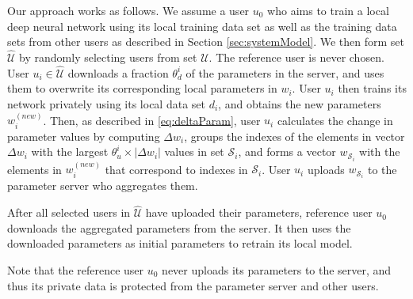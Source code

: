 \documentclass[conference]{IEEEtran}
\begin{document}
Our approach works as follows. 
We assume a user $u_0$ who aims to train a local deep neural network using its local training data set as well as the training
data sets from other users as described in Section \ref{sec:systemModel}.  We then form set $\hat{\mathcal{{U}}}$ by randomly selecting
users from set $\mathcal{U}$. The reference user is never chosen.  
User $u_i\in\hat{\mathcal{U}}$ downloads a fraction $\theta_d^i$ of the parameters
in the server, and uses them to overwrite its  corresponding local parameters in $w_i$.
User $u_i$ then trains its network privately using its local data set  $d_i$, and obtains the new parameters $w_i^{(new)}$.
Then, as described in \eqref{eq:deltaParam}, user $u_i$ calculates the change in parameter values by computing $\Delta w_i$, groups the
indexes of the elements in vector $\Delta w_i$ with the largest $\theta_u^i\times |\Delta w_i|$ values in set $\mathcal{S}_i$, and 
forms a vector $w_{\mathcal{S}_i}$ with the elements in $w_i^{(new)}$ that correspond to indexes in $\mathcal{S}_i$. 
User $u_i$ uploads $w_{\mathcal{S}_i}$ to the parameter server who aggregates them. 

After all selected users in $\hat{\mathcal{U}}$ have uploaded their parameters, reference user $u_0$ downloads the aggregated
parameters from the server. It then uses the downloaded parameters as initial parameters to retrain its local model. 

Note that the reference user  $u_0$ never uploads its parameters to the server, and thus its private data is protected from the
parameter server and other users. 

\end{document}
